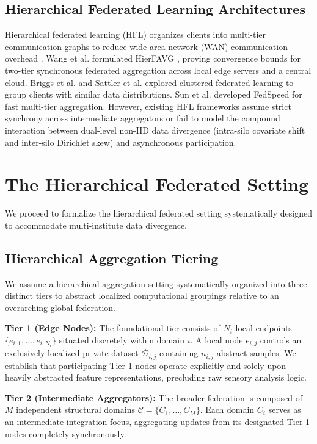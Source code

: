 \documentclass[conference]{IEEEtran}
\begin{document}
\subsection{Hierarchical Federated Learning Architectures}
Hierarchical federated learning (HFL) organizes clients into multi-tier communication graphs to reduce wide-area network (WAN) communication overhead \cite{b30, b31}. Wang et al. formulated HierFAVG \cite{b38}, proving convergence bounds for two-tier synchronous federated aggregation across local edge servers and a central cloud. Briggs et al. \cite{b32} and Sattler et al. \cite{b39} explored clustered federated learning to group clients with similar data distributions. Sun et al. developed FedSpeed \cite{b40} for fast multi-tier aggregation. However, existing HFL frameworks assume strict synchrony across intermediate aggregators or fail to model the compound interaction between dual-level non-IID data divergence (intra-silo covariate shift and inter-silo Dirichlet skew) and asynchronous participation.

\section{The Hierarchical Federated Setting}

We proceed to formalize the hierarchical federated setting systematically designed to accommodate multi-institute data divergence.

\subsection{Hierarchical Aggregation Tiering}
We assume a hierarchical aggregation setting systematically organized into three distinct tiers to abstract localized computational groupings relative to an overarching global federation.

\textbf{Tier 1 (Edge Nodes):} The foundational tier consists of $N_i$ local endpoints $\{e_{i,1}, \ldots, e_{i,N_i}\}$ situated discretely within domain $i$. A local node $e_{i,j}$ controls an exclusively localized private dataset $\mathcal{D}_{i,j}$ containing $n_{i,j}$ abstract samples. We establish that participating Tier 1 nodes operate explicitly and solely upon heavily abstracted feature representations, precluding raw sensory analysis logic.

\textbf{Tier 2 (Intermediate Aggregators):} The broader federation is composed of $M$ independent structural domains $\mathcal{C} = \{C_1, \ldots, C_M\}$. Each domain $C_i$ serves as an intermediate integration focus, aggregating updates from its designated Tier 1 nodes completely synchronously.
\end{document}
